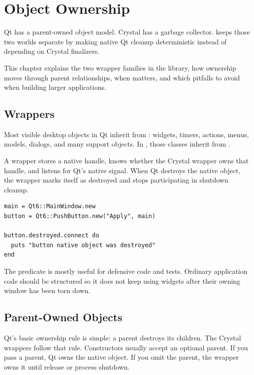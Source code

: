 \chapter{Object Ownership}

Qt has a parent-owned object model. Crystal has a garbage collector.  keeps those two worlds separate by making native Qt cleanup deterministic instead of depending on Crystal finalizers.

This chapter explains the two wrapper families in the  library, how ownership moves through parent relationships, when  matters, and which pitfalls to avoid when building larger applications.

\section{ Wrappers}

Most visible desktop objects in Qt inherit from : widgets, timers, actions, menus, models, dialogs, and many support objects. In , those classes inherit from .

A  wrapper stores a native handle, knows whether the Crystal wrapper owns that handle, and listens for Qt's native  signal. When Qt destroys the native object, the wrapper marks itself as destroyed and stops participating in shutdown cleanup.

\begin{lstlisting}[style=crystal]
main = Qt6::MainWindow.new
button = Qt6::PushButton.new("Apply", main)

button.destroyed.connect do
  puts "button native object was destroyed"
end
\end{lstlisting}

The  predicate is mostly useful for defensive code and tests. Ordinary application code should be structured so it does not keep using widgets after their owning window has been torn down.

\section{Parent-Owned Objects}

Qt's basic ownership rule is simple: a parent destroys its children. The Crystal wrappers follow that rule. Constructors usually accept an optional parent. If you pass a parent, Qt owns the native object. If you omit the parent, the wrapper owns it until release or process shutdown.

